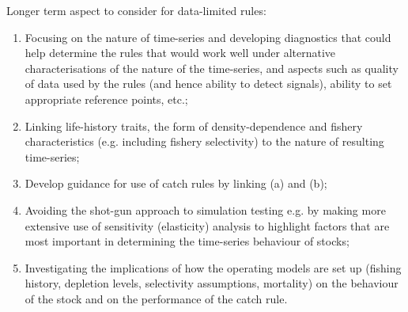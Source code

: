 
\item Longer term aspect to consider for data-limited rules:

\begin{enumerate}[9.1]

\item Focusing on the nature of time-series and developing diagnostics that could help determine the rules that would work well under alternative characterisations of the nature of the time-series, and aspects such as quality of data used by the rules (and hence ability to detect signals), ability to set appropriate reference points, etc.;

\item Linking life-history traits, the form of density-dependence and fishery characteristics (e.g. including fishery selectivity) to the nature of resulting time-series;

\item Develop guidance for use of catch rules by linking (a) and (b);

\item Avoiding the shot-gun approach to simulation testing e.g. by making more extensive use of sensitivity (elasticity) analysis to highlight factors that are most important in determining the time-series behaviour of stocks;

\item Investigating the implications of how the operating models are set up (fishing history, depletion levels, selectivity assumptions, mortality) on the behaviour of the stock and on the performance of the catch rule.

\end{enumerate}

